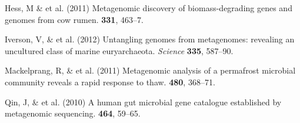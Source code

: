 \documentclass{pnastwo}
\begin{document}
\begin{article}
\begin{thebibliography}{10}
 Hess, M \& et al. \newblock
(2011) Metagenomic discovery of biomass-degrading genes and genomes from cow
rumen.  {\bf 331}, 463--7.



 Iverson, V, \& et al. \newblock (2012) Untangling genomes from
metagenomes: revealing an uncultured class of marine euryarchaeota. \newblock
{\em Science} {\bf 335}, 587--90.



 Mackelprang, R, \& et al.
\newblock (2011) Metagenomic analysis of a permafrost microbial community
reveals a rapid response to thaw.  {\bf 480}, 368--71.


 Qin, J, \& et al. \newblock
(2010) A human gut microbial gene catalogue established by metagenomic
sequencing.  {\bf 464}, 59--65.
%



\end{thebibliography}
\end{article}
\end{document}
